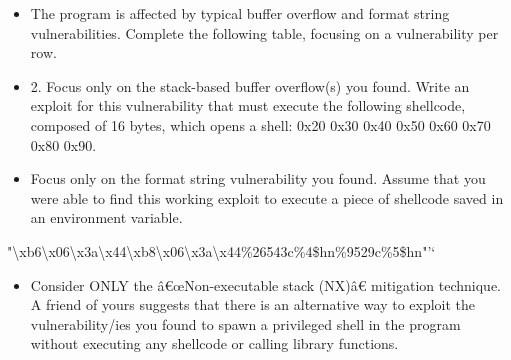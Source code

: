 \documentclass{article}
\begin{document}
\begin{itemize}
    \item[\textbf{1.}] [1 point] The program is affected by typical buffer overflow and format string vulnerabilities. Complete the following table, focusing on a vulnerability per row.
    \item[\textbf{2.}] [2 points] 2. Focus only on the stack-based buffer overflow(s) you found. Write an exploit for this vulnerability that must execute the following shellcode, composed of 16 bytes, which opens a shell: 0x20 0x30 0x40 0x50 0x60 0x70 0x80 0x90.
    \item[\textbf{3.}] [2 points] Focus only on the format string vulnerability you found. Assume that you were able to find this working exploit to execute a piece of shellcode saved in an environment variable.
\end{itemize}
"\textbackslash{}xb6\textbackslash{}x06\textbackslash{}x3a\textbackslash{}x44\textbackslash{}xb8\textbackslash{}x06\textbackslash{}x3a\textbackslash{}x44\%26543c\%4\$hn\%9529c\%5\$hn"'`
\begin{itemize}
    \item[\textbf{4.}] [1 points] Consider ONLY the â€œNon-executable stack (NX)â€ mitigation technique. A friend of yours suggests that there is an alternative way to exploit the vulnerability/ies you found to spawn a privileged shell in the program without executing any shellcode or calling library functions.
\end{itemize}
\end{document}
